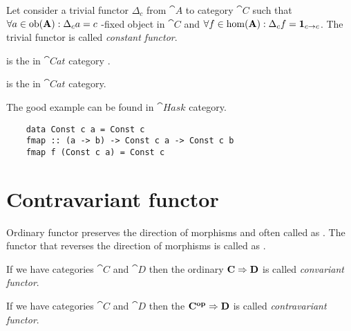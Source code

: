 \begin{definition}
  \label{def:const_functor}
  Let consider a trivial functor $\Delta_c$ from 
  $\cat{A}$ to category $\cat{C}$ such that $\forall a \in \mathrm{ob}(\mathbf{A}):
  \Delta_c a = c$ -fixed object in $\cat{C}$ and 
  $\forall f \in \mathrm{hom}(\mathbf{A}): \Delta_c f = \mathbf{1}_{ c \to c }$. The trivial
  functor is called \textit{constant functor}.
\end{definition}

\begin{example}
  \label{ex:initial_object_cat}
   is the 
  in $\cat{Cat}$ category \cite{bib:stackexchange:empty_category}.
\end{example}

\begin{example}
  \label{ex:terminal_object_cat}
   is the 
  in $\cat{Cat}$ category.
\end{example}


The good example can be found in $\cat{Hask}$ category.
\begin{example}
  \label{ex:const_functor_hask}
  \begin{verbatim}
    data Const c a = Const c
    fmap :: (a -> b) -> Const c a -> Const c b
    fmap f (Const c a) = Const c
  \end{verbatim}
\end{example}

\section{Contravariant functor}
Ordinary functor preserves the direction of morphisms and often called
as . The functor that reverses the
direction of morphisms is called as
. 

\begin{definition}
  \label{def:covariant_functor}
  If we have categories $\cat{C}$ and $\cat{D}$ then the
  ordinary  $\mathbf{C} \Rightarrow \mathbf{D}$ is called
  \textit{convariant functor}. 
\end{definition}

\begin{definition}
  \label{def:contravariant_functor}
  If we have categories $\cat{C}$ and $\cat{D}$ then the
   $\mathbf{C^{op}} \Rightarrow \mathbf{D}$ is called
  \textit{contravariant functor}. 
\end{definition}


